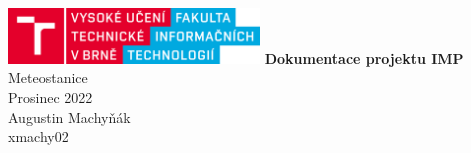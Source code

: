 \documentclass{article}
\begin{document}
\begin{titlepage}
    \centering
    \vfill
    \includegraphics[width=0.5\textwidth]{fit_logo}
    \vfill
    {\Huge{\bfseries{Dokumentace projektu IMP}}\\
        Meteostanice\\
        \vspace*{1em}
        \Large{Prosinec 2022}\\
        \vfill
        Augustin Machyňák\\
        xmachy02
    }
\end{titlepage}

\newpage



\newpage


\newpage


\newpage



\end{document}
